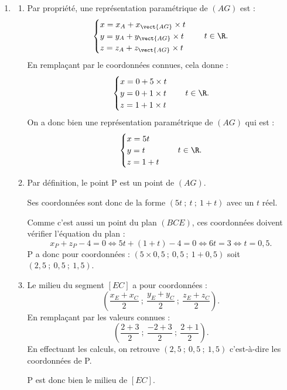 \begin{enumerate}
\item \begin{enumerate}
\item Par propriété, une représentation paramétrique de $(AG)$ est :
\[
\begin{cases}
x=x_A+x_{\vect{AG}}\times t\\
y=y_A+y_{\vect{AG}}\times t\\
z=z_A+z_{\vect{AG}}\times t
\end{cases}\quad t\in\R.
\]
En remplaçant par le coordonnées connues, cela donne :
\[
\begin{cases}
x=0+5\times t\\
y=0+1\times t\\
z=1+1\times t
\end{cases}\quad t\in\R.
\]
On a donc bien une représentation paramétrique de $(AG)$ qui est :
\[
\begin{cases}
x=5t\\
y=t\\
z=1+t
\end{cases}\quad t\in\R.
\]

\item Par définition, le point P est un point de $(AG)$.

Ses coordonnées sont donc de la forme $(5t~;~t~;~1+t)$ avec un $t$ réel.

Comme c'est aussi un point du plan $(BCE)$, ces coordonnées doivent vérifier l'équation du plan :
\[
x_P+z_P-4=0\Longleftrightarrow 5t+(1+t)-4=0
\Longleftrightarrow 6t=3
\Longleftrightarrow t=0,5.
\]
P a donc pour coordonnées : $(5\times 0,5~;~0,5~;~1+0,5)$ soit $(2,5~;~0,5~;~1,5)$.

\item Le milieu du segment $[EC]$ a pour coordonnées :
\[
\left(\dfrac{x_E+x_C}{2}~;~\dfrac{y_E+y_C}{2}~;~\dfrac{z_E+z_C}{2}\right).
\]
En remplaçant par les valeurs connues :
\[
\left(\dfrac{2+3}{2}~;~\dfrac{-2+3}{2}~;~\dfrac{2+1}{2}\right).
\]
En effectuant les calculs, on retrouve $(2,5~;~0,5~;~1,5)$ c'est-à-dire les coordonnées de P.

P est donc bien le milieu de $[EC]$.
\end{enumerate}


\end{enumerate}
